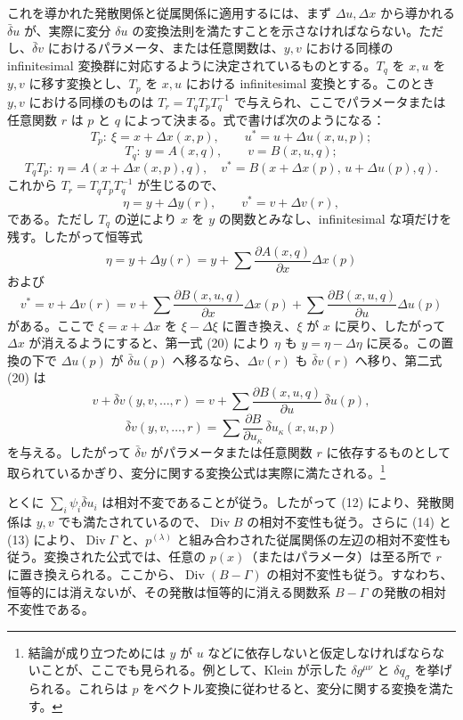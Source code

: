 \documentclass[11pt]{article}
\newcommand{\D}{\Delta}
\providecommand{\Div}{\operatorname{Div}}
\providecommand{\bd}{\bar{\delta}}
\providecommand{\p}{\partial}
\begin{document}
これを導かれた発散関係と従属関係に適用するには、まず \(\D u,\D x\) から導かれる \(\bd u\) が、実際に変分 \(\delta u\) の変換法則を満たすことを示さなければならない。ただし、\(\bd v\) におけるパラメータ、または任意関数は、\(y,v\) における同様の infinitesimal 変換群に対応するように決定されているものとする。\(T_q\) を \(x,u\) を \(y,v\) に移す変換とし、\(T_p\) を \(x,u\) における infinitesimal 変換とする。このとき \(y,v\) における同様のものは \(T_r=T_qT_pT_q^{-1}\) で与えられ、ここでパラメータまたは任意関数 \(r\) は \(p\) と \(q\) によって決まる。式で書けば次のようになる：
\[
T_p:\ \xi=x+\D x(x,p),\qquad u^*=u+\D u(x,u,p);
\]
\[
T_q:\ y=A(x,q),\qquad v=B(x,u,q);
\]
\[
T_qT_p:\ \eta=A(x+\D x(x,p),q),\quad
v^*=B(x+\D x(p),\,u+\D u(p),q).
\]
これから \(T_r=T_qT_pT_q^{-1}\) が生じるので、
\[
\eta=y+\D y(r),\qquad v^*=v+\D v(r),
\]
である。ただし \(T_q\) の逆により \(x\) を \(y\) の関数とみなし、infinitesimal な項だけを残す。したがって恒等式
\begin{equation}
\eta=y+\D y(r)=y+\sum\frac{\p A(x,q)}{\p x}\D x(p)
\tag{20a}
\end{equation}
および
\begin{equation}
v^*=v+\D v(r)=v+\sum\frac{\p B(x,u,q)}{\p x}\D x(p)
+\sum\frac{\p B(x,u,q)}{\p u}\D u(p)
\tag{20b}
\end{equation}
がある。ここで \(\xi=x+\D x\) を \(\xi-\D \xi\) に置き換え、\(\xi\) が \(x\) に戻り、したがって \(\D x\) が消えるようにすると、第一式 (20) により \(\eta\) も \(y=\eta-\D\eta\) に戻る。この置換の下で \(\D u(p)\) が \(\bd u(p)\) へ移るなら、\(\D v(r)\) も \(\bd v(r)\) へ移り、第二式 (20) は
\[
v+\bd v(y,v,\ldots,r)=v+\sum\frac{\p B(x,u,q)}{\p u}\,\bd u(p),
\]
\[
\bd v(y,v,\ldots,r)=\sum\frac{\p B}{\p u_\kappa}\,\bd u_\kappa(x,u,p)
\]
を与える。したがって \(\bd v\) がパラメータまたは任意関数 \(r\) に依存するものとして取られているかぎり、変分に関する変換公式は実際に満たされる。\footnote{結論が成り立つためには \(y\) が \(u\) などに依存しないと仮定しなければならないことが、ここでも見られる。例として、Klein が示した \(\delta g^{\mu\nu}\) と \(\delta q_\sigma\) を挙げられる。これらは \(p\) をベクトル変換に従わせると、変分に関する変換を満たす。}

とくに \(\sum_i\psi_i\bd u_i\) は相対不変であることが従う。したがって (12) により、発散関係は \(y,v\) でも満たされているので、\(\Div B\) の相対不変性も従う。さらに (14) と (13) により、\(\Div\Gamma\) と、\(p^{(\lambda)}\) と組み合わされた従属関係の左辺の相対不変性も従う。変換された公式では、任意の \(p(x)\)（またはパラメータ）は至る所で \(r\) に置き換えられる。ここから、\(\Div(B-\Gamma)\) の相対不変性も従う。すなわち、恒等的には消えないが、その発散は恒等的に消える関数系 \(B-\Gamma\) の発散の相対不変性である。
\end{document}

